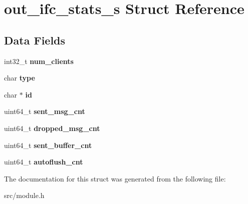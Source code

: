 \hypertarget{structout__ifc__stats__s}{}\section{out\+\_\+ifc\+\_\+stats\+\_\+s Struct Reference}
\label{structout__ifc__stats__s}
\subsection*{Data Fields}
\begin{DoxyCompactItemize}
\item 
\mbox{\label{structout__ifc__stats__s_aa1e300684dd53cce9a97a320e661fff5}} 
int32\+\_\+t {\bfseries num\+\_\+clients}
\item 
\mbox{\label{structout__ifc__stats__s_af1bf599c78533108135272c6cfb98595}} 
char {\bfseries type}
\item 
\mbox{\label{structout__ifc__stats__s_af80f3ce3c4feacd789eb49ff21becf06}} 
char $\ast$ {\bfseries id}
\item 
\mbox{\label{structout__ifc__stats__s_a3d6c7212bbdf84e0a3114e7217770667}} 
uint64\+\_\+t {\bfseries sent\+\_\+msg\+\_\+cnt}
\item 
\mbox{\label{structout__ifc__stats__s_a388305e2b228431601fa78b11e6e620e}} 
uint64\+\_\+t {\bfseries dropped\+\_\+msg\+\_\+cnt}
\item 
\mbox{\label{structout__ifc__stats__s_aeb567810437d5a10b5a0af95066624cc}} 
uint64\+\_\+t {\bfseries sent\+\_\+buffer\+\_\+cnt}
\item 
\mbox{\label{structout__ifc__stats__s_a6fec0612cbbe40640314bc11d7a84064}} 
uint64\+\_\+t {\bfseries autoflush\+\_\+cnt}
\end{DoxyCompactItemize}


The documentation for this struct was generated from the following file\+:\begin{DoxyCompactItemize}
\item 
src/module.\+h\end{DoxyCompactItemize}
